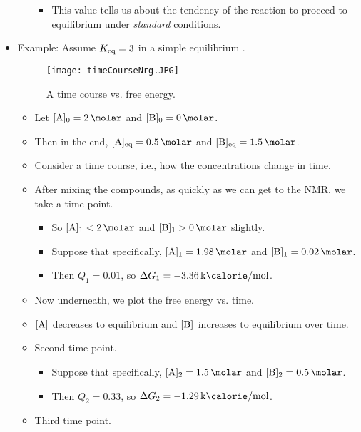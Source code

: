 \documentclass[../notes.tex]{subfiles}
\begin{document}
\begin{itemize}
\begin{itemize}
\begin{itemize}
            \item This value tells us about the tendency of the reaction to proceed to equilibrium under \emph{standard} conditions.
        \end{itemize}
    \end{itemize}
    \item Example: Assume $K_\textup{eq}=3$ in a simple equilibrium .
    \begin{figure}[h!]
        \centering
        \texttt{[image: timeCourseNrg.JPG]}
        \caption{A time course vs. free energy.}
        \label{fig:timeCourseNrg}
    \end{figure}
    \pagebreak
    \begin{itemize}
        \item Let $\cnc[0]{A}=\SI{2}{\molar}$ and $\cnc[0]{B}=\SI{0}{\molar}$.
        \item Then in the end, $\cnc[eq]{A}=\SI{0.5}{\molar}$ and $\cnc[eq]{B}=\SI{1.5}{\molar}$.
        \item Consider a time course, i.e., how the concentrations change in time.
        \item After mixing the compounds, as quickly as we can get to the NMR, we take a time point.
        \begin{itemize}
            \item So $\cnc[1]{A}<\SI{2}{\molar}$ and $\cnc[1]{B}>\SI{0}{\molar}$ slightly.
            \item Suppose that specifically, $\cnc[1]{A}=\SI{1.98}{\molar}$ and $\cnc[1]{B}=\SI{0.02}{\molar}$.
            \item Then $Q_1=0.01$, so $\Delta G_1=-\kcal{3.36}$.
        \end{itemize}
        \item Now underneath, we plot the free energy vs. time.
        \item $\cnc{A}$ decreases to equilibrium and $\cnc{B}$ increases to equilibrium over time.
        \item Second time point.
        \begin{itemize}
            \item Suppose that specifically, $\cnc[2]{A}=\SI{1.5}{\molar}$ and $\cnc[2]{B}=\SI{0.5}{\molar}$.
            \item Then $Q_2=0.33$, so $\Delta G_2=-\kcal{1.29}$.
        \end{itemize}
        \item Third time point.
        \begin{itemize}

\end{itemize}
\end{itemize}
\end{itemize}
\end{document}
